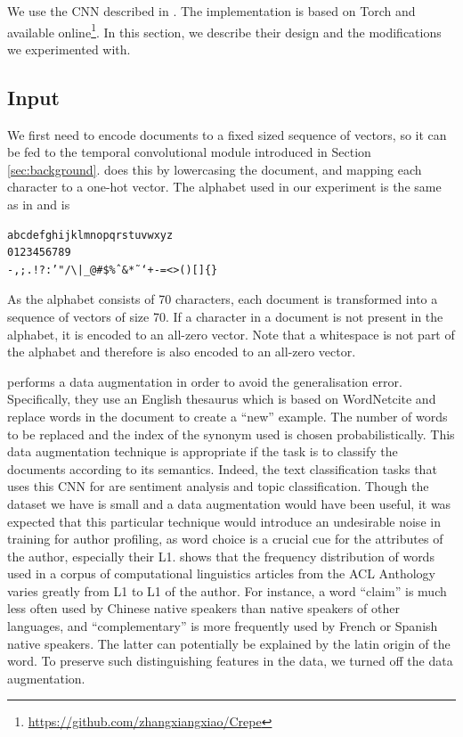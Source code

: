 We use the CNN described in \citep{zhang2015character}.
The implementation is based on Torch \citep{torch} and available online\footnote{\url{https://github.com/zhangxiangxiao/Crepe}}.
In this section, we describe their design and the modifications we experimented with.
\subsection{Input}
\label{sub:input}
We first need to encode documents to a fixed sized sequence of vectors, so it can be fed to the temporal convolutional module introduced in Section \ref{sec:background}.
\cite{zhang2015character} does this by lowercasing the document, and mapping each character to a one-hot vector.
The alphabet used in our experiment is the same as in \citep{zhang2015character} and is 
\begin{verbatim}
abcdefghijklmnopqrstuvwxyz
0123456789
-,;.!?:’"/\|_@#$%ˆ&*˜‘+-=<>()[]{}
\end{verbatim} 
As the alphabet consists of 70 characters, each document is transformed into a sequence of vectors of size 70.
If a character in a document is not present in the alphabet, it is encoded to an all-zero vector.
Note that a whitespace is not part of the alphabet and therefore is also encoded to an all-zero vector.

\citep{zhang2015character} performs a data augmentation in order to avoid the generalisation error.
Specifically, they use an English thesaurus which is based on WordNet\color{red}cite\color{black} and replace words in the document to create a ``new'' example.
The number of words to be replaced and the index of the synonym used is chosen probabilistically.
This data augmentation technique is appropriate if the task is to classify the documents according to its semantics.
Indeed, the text classification tasks that \cite{zhang2015character} uses this CNN for are sentiment analysis and topic classification.
Though the dataset we have is small and a data augmentation would have been useful, it was expected that this particular technique would introduce an undesirable noise in training for author profiling, as word choice is a crucial cue for the attributes of the author, especially their L1.
\citep{yarowsky2013learning} shows that the frequency distribution of words used in a corpus of computational linguistics articles from the ACL Anthology varies greatly from L1 to L1 of the author.
For instance, a word ``claim'' is much less often used by Chinese native speakers than native speakers of other languages, and ``complementary'' is more frequently used by French or Spanish native speakers.
The latter can potentially be explained by the latin origin of the word.
To preserve such distinguishing features in the data, we turned off the data augmentation.

